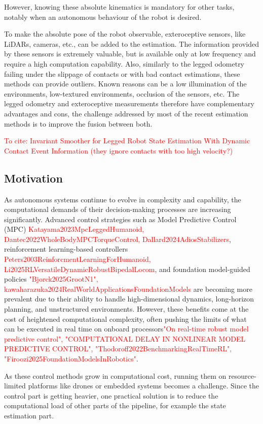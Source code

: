 \documentclass{IJCAS}
\begin{document}
    However, knowing these absolute kinematics is mandatory for other tasks, notably when an autonomous behaviour of the robot is desired. 
    
    To make the absolute pose of the robot observable, exteroceptive sensors, like LiDARs, cameras, etc., can be added to the estimation. The information provided by these sensors is extremely valuable, but is available only at low frequency and require a high computation capability. Also, similarly to the legged odometry failing under the slippage of contacts or with bad contact estimations, these methods can provide outliers. Known reasons can be a low illumination of the environments, low-textured environments, occlusion of the sensors, etc. The legged odometry and exteroceptive measurements therefore have complementary advantages and cons, the challenge addressed by most of the recent estimation methods is to improve the fusion between both.
    

    \textcolor{red}{To cite: Invariant Smoother for Legged Robot State 	Estimation With Dynamic Contact Event Information (they ignore contacts with too high velocity?)}
   
\subsection{Motivation}
    
As autonomous systems continue to evolve in complexity and capability, the computational demands of their decision-making processes are increasing significantly. Advanced control strategies such as Model Predictive Control (MPC) \textcolor{red}{Katayama2023MpcLeggedHumanoid, Dantec2022WholeBodyMPCTorqueControl, Dallard2024AdiosStabilizers}, reinforcement learning-based controllers \textcolor{red}{Peters2003ReinforcmentLearningForHumanoid, Li2025RLVersatileDynamicRobustBipedalLocom}, and foundation model-guided policies \textcolor{red}{"Bjorck2025GrootN1", kawaharazuka2024RealWorldApplicationsFoundationModels} are becoming more prevalent due to their ability to handle high-dimensional dynamics, long-horizon planning, and unstructured environments. However, these benefits come at the cost of heightened computational complexity, often pushing the limits of what can be executed in real time on onboard processors\textcolor{red}{"On real-time robust model predictive control", "COMPUTATIONAL DELAY IN NONLINEAR MODEL
PREDICTIVE CONTROL", "Thodoroff2022BenchmarkingRealTimeRL", "Firoozi2025FoundationModelsInRobotics"}.

As these control methods grow in computational cost, running them on resource-limited platforms like drones or embedded systems becomes a challenge. Since the control part is getting heavier, one practical solution is to reduce the computational load of other parts of the pipeline, for example the state estimation part.
\end{document}
